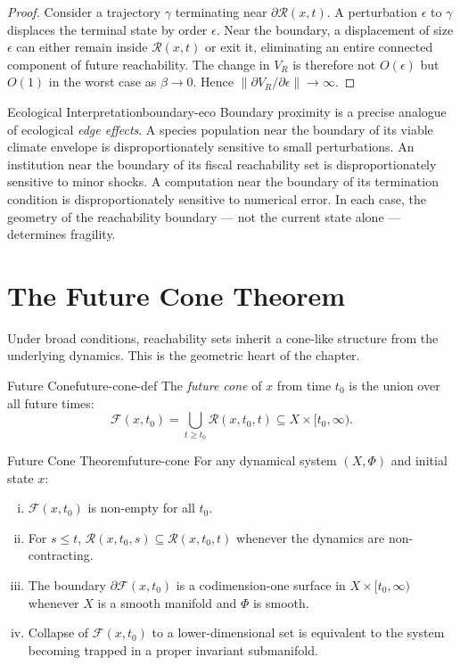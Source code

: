 \documentclass[12pt,twoside,openright]{book}
\newcommand{\reach}{\mathcal{R}}
\begin{document}
\begin{proof}
  Consider a trajectory $\gamma$ terminating near
  $\partial\reach(x,t)$. A perturbation $\epsilon$ to
  $\gamma$ displaces the terminal state by order $\epsilon$.
  Near the boundary, a displacement of size $\epsilon$ can
  either remain inside $\reach(x,t)$ or exit it, eliminating
  an entire connected component of future reachability. The
  change in $V_R$ is therefore not $O(\epsilon)$ but $O(1)$
  in the worst case as $\beta\to0$. Hence
  $\|\partial V_R/\partial\epsilon\|\to\infty$.
\end{proof}

\begin{remark}{Ecological Interpretation}{boundary-eco}
  Boundary proximity is a precise analogue of ecological
  \emph{edge effects}. A species population near the
  boundary of its viable climate envelope is
  disproportionately sensitive to small perturbations. An
  institution near the boundary of its fiscal reachability
  set is disproportionately sensitive to minor shocks. A
  computation near the boundary of its termination condition
  is disproportionately sensitive to numerical error. In
  each case, the geometry of the reachability boundary ---
  not the current state alone --- determines fragility.
\end{remark}

\section{The Future Cone Theorem}
\label{sec:ch13-future-cone}

Under broad conditions, reachability sets inherit a
cone-like structure from the underlying dynamics. This is
the geometric heart of the chapter.

\begin{definition}{Future Cone}{future-cone-def}
  The \emph{future cone} of $x$ from time $t_0$ is the union
  over all future times:
  \[
    \mathcal{F}(x,t_0) = \bigcup_{t\ge t_0} \reach(x,t_0,t)
    \subseteq X \times [t_0,\infty).
  \]
\end{definition}

\begin{theorem}{Future Cone Theorem}{future-cone}
  For any dynamical system $(X,\Phi)$ and initial state $x$:
  \begin{enumerate}[(i)]
    \item $\mathcal{F}(x,t_0)$ is non-empty for all $t_0$.
    \item For $s\le t$, $\reach(x,t_0,s) \subseteq
          \reach(x,t_0,t)$ whenever the dynamics are
          non-contracting.
    \item The boundary $\partial\mathcal{F}(x,t_0)$ is a
          codimension-one surface in
          $X\times[t_0,\infty)$ whenever $X$ is a smooth
          manifold and $\Phi$ is smooth.
    \item Collapse of $\mathcal{F}(x,t_0)$ to a
          lower-dimensional set is equivalent to the system
          becoming trapped in a proper invariant
          submanifold.
  \end{enumerate}
\end{theorem}
\end{document}

